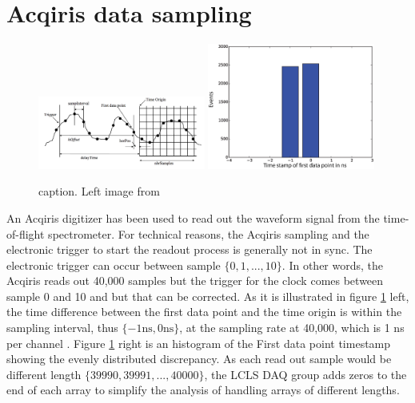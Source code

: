 \section{Acqiris data sampling}
\begin{figure}
	\centering
		\includegraphics[width=0.49\textwidth]{images/Acqiris-waveform-readout.png}
		\includegraphics[width=0.49\textwidth]{images/firstDataPoint.eps}
	\caption{caption. Left image from \citep{Acqiris-manual}}
	\label{fig:Acqiris-waveform-readout}
\end{figure}
An Acqiris digitizer has been used to read out the waveform signal from the time-of-flight spectrometer. For technical reasons, the Acqiris sampling and the electronic trigger to start the readout process is generally not in sync. The electronic trigger can occur between sample $\{0,1,...,10\}$. In other words, the Acqiris reads out 40,000 samples but the trigger for the clock comes between sample 0 and 10 and but that can be corrected. As it is illustrated in figure \ref{fig:Acqiris-waveform-readout} left, the time difference between the first data point and the time origin is within the sampling interval, thus $\{-1 \text{ns}, 0 \text{ns}\}$, at the sampling rate at 40,000, which is 1 ns per channel \citep{Acqiris-manual}. Figure \ref{fig:Acqiris-waveform-readout} right is an histogram of the First data point timestamp showing the evenly distributed discrepancy. As each read out sample would be different length $\{39990,39991,...,40000\}$, the LCLS DAQ group adds zeros to the end of each array to simplify the analysis of handling arrays of different lengths.\\

